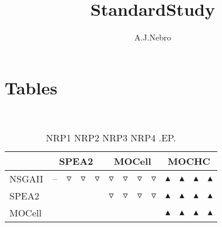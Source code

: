 \documentclass{article}
\title{StandardStudy}
\author{A.J.Nebro}
\begin{document}
\maketitle
\section{Tables}
\
\begin{table}
\caption{
NRP1 NRP2 NRP3 NRP4 
.EP.}
\label{Table:
NRP1 NRP2 NRP3 NRP4 
.EP.}
\centering
\begin{scriptsize}
\begin{tabular}{
| l | p{0.15cm }p{0.15cm }p{0.15cm }p{0.15cm } | p{0.15cm }p{0.15cm }p{0.15cm }p{0.15cm } | p{0.15cm }p{0.15cm }p{0.15cm }p{0.15cm } | 
}
\hline \multicolumn{1}{|c|}{} & \multicolumn{4}{c|}{SPEA2} & \multicolumn{4}{c|}{MOCell} & \multicolumn{4}{c|}{MOCHC} \\
\hline 
NSGAII
 & 
--
&
$\triangledown$
&
$\triangledown$
&
$\triangledown$
 & 
$\triangledown$
&
$\triangledown$
&
$\triangledown$
&
$\triangledown$
 & 
$\blacktriangle$
&
$\blacktriangle$
&
$\blacktriangle$
&
$\blacktriangle$
 \\ 
SPEA2
 & 
  
&
  
&
  
&
  
 & 
$\triangledown$
&
$\triangledown$
&
$\triangledown$
&
$\triangledown$
 & 
$\blacktriangle$
&
$\blacktriangle$
&
$\blacktriangle$
&
$\blacktriangle$
 \\ 
MOCell
 & 
 
&
 
&
 
&
 
 & 
  
&
  
&
  
&
  
 & 
$\blacktriangle$
&
$\blacktriangle$
&
$\blacktriangle$
&
$\blacktriangle$
 \\ 
\hline
\end{tabular}
\end{scriptsize}
\end{table}
\end{document}
